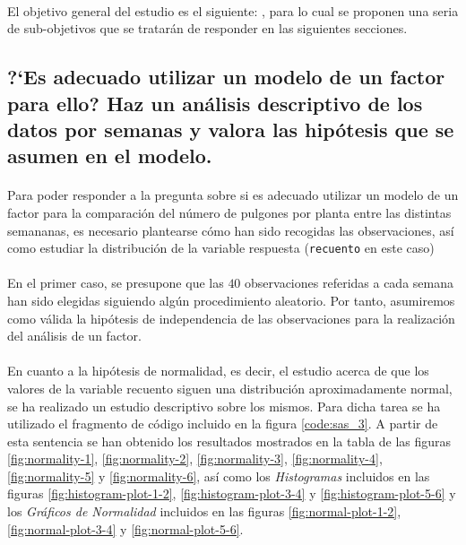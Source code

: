 \documentclass[11pt]{article}
\begin{document}
    \paragraph{}
    El objetivo general del estudio es el siguiente: \textbf{}, para lo cual se proponen una seria de sub-objetivos que se tratarán de responder en las siguientes secciones.

    \subsection{?`Es adecuado utilizar un modelo de un factor para ello? Haz un análisis descriptivo de los datos por semanas y valora las hipótesis que se asumen en el modelo.}
    \label{sec:e1}

      \paragraph{}
      Para poder responder a la pregunta sobre si es adecuado utilizar un modelo de un factor para la comparación del número de pulgones por planta entre las distintas semananas, es necesario plantearse cómo han sido recogidas las observaciones, así como estudiar la distribución de la variable respuesta (\texttt{recuento} en este caso)

      \paragraph{}
      En el primer caso, se presupone que las $40$ observaciones referidas a cada semana han sido elegidas siguiendo algún procedimiento aleatorio. Por tanto, asumiremos como válida la hipótesis de independencia de las observaciones para la realización del análisis de un factor.

      \paragraph{}
      En cuanto a la hipótesis de normalidad, es decir, el estudio acerca de que los valores de la variable recuento siguen  una distribución aproximadamente normal, se ha realizado un estudio descriptivo sobre los mismos. Para dicha tarea se ha utilizado el fragmento de código incluido en la figura \ref{code:sas_3}. A partir de esta sentencia se han obtenido los resultados mostrados en la tabla de las figuras \ref{fig:normality-1}, \ref{fig:normality-2}, \ref{fig:normality-3}, \ref{fig:normality-4}, \ref{fig:normality-5} y \ref{fig:normality-6}, así como los \emph{Histogramas} incluidos en las figuras \ref{fig:histogram-plot-1-2}, \ref{fig:histogram-plot-3-4} y \ref{fig:histogram-plot-5-6} y los \emph{Gráficos de Normalidad} incluidos en las figuras \ref{fig:normal-plot-1-2}, \ref{fig:normal-plot-3-4} y \ref{fig:normal-plot-5-6}.
\end{document}
